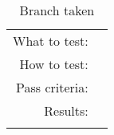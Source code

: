 \begin{table}[H]
  \begin{tabular}{r | p{8cm}}
    \noalign{\smallskip}\hline\noalign{\smallskip}
    
    What to test:  &  \\

    \noalign{\smallskip}\hline\noalign{\smallskip}

    How to test:   &  \\

    \noalign{\smallskip}\hline\noalign{\smallskip}

    Pass criteria: &  \\

    \noalign{\smallskip}\hline\noalign{\smallskip}
    
    Results: &  \\
   \noalign{\smallskip}\hline\noalign{\smallskip}
  
  
  
  \end{tabular}
  \caption{Branch taken}
  \label{testing:fitness:pipeline_test}
\end{table}

